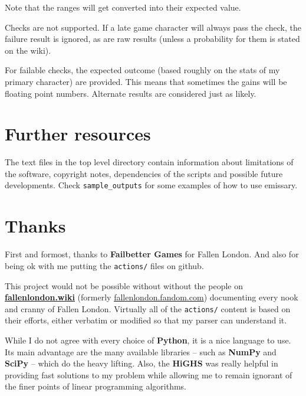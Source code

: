 \documentclass[a4paper,11pt,openright,twoside]{scrartcl}
\begin{document}
Note that the ranges will get converted into their expected value. 

Checks are not supported. If a late game character will always pass the check, the failure result is ignored, as are raw results (unless a probability for them is stated on the wiki).

For failable checks, the expected outcome (based roughly on the stats of my primary character) are provided. This means that sometimes the gains will be floating point numbers. Alternate results are considered just as likely.

\section{Further resources}

The text files in the top level directory contain information about limitations of the software, copyright notes, dependencies of the scripts and possible future developments. Check \texttt{sample\_outputs} for some examples of how to use emissary.

\section{Thanks}

First and formost, thanks to \textbf{Failbetter Games} for Fallen London. And also for being ok with me putting the \texttt{actions/} files on github. 

This project would not be possible without without the people on \textbf{\url{fallenlondon.wiki}} (formerly \url{fallenlondon.fandom.com}) documenting every nook and cranny of Fallen London. Virtually all of the  \texttt{actions/} content is based on their efforts, either verbatim or modified so that my parser can understand it.

While I do not agree with every choice of \textbf{Python}, it is a nice language to use. Its main advantage are the many available libraries -- such as \textbf{NumPy} and \textbf{SciPy} -- which do the heavy lifting. Also, the \textbf{HiGHS} was really helpful in providing fast solutions to my problem while allowing me to remain ignorant of the finer points of linear programming algorithms. 
\end{document}

